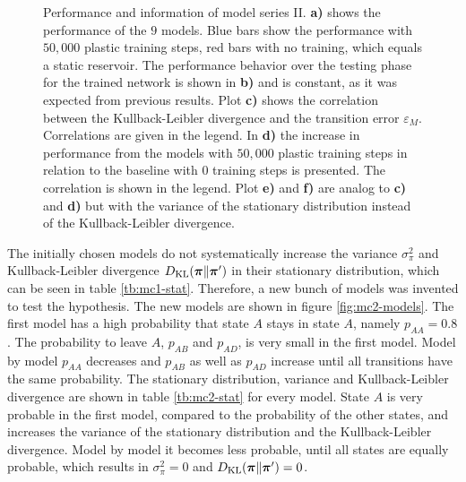 \begin{figure}[p]
    \caption[Performance and information of model series II]{Performance and information of model series II. \textbf{a)} shows the performance of the $9$ models. Blue bars show the performance with $50,000$ plastic training steps, red bars with no training, which equals a static reservoir. The performance behavior over the testing phase for the trained network is shown in \textbf{b)} and is constant, as it was expected from previous results. Plot \textbf{c)} shows the correlation between the Kullback-Leibler divergence and the transition error $\varepsilon_M$. Correlations are given in the legend. In \textbf{d)} the increase in performance from the models with $50,000$ plastic training steps in relation to the baseline with $0$ training steps is presented. The correlation is shown in the legend. Plot \textbf{e)} and \textbf{f)} are analog to \textbf{c)} and \textbf{d)} but with the variance of the stationary distribution instead of the Kullback-Leibler divergence.}
    \label{fig:mc2-performance}
\end{figure}

The initially chosen models do not systematically increase the variance $\sigma^2_\pi$ and Kullback-Leibler divergence $D_{\text{KL}}(\bm\pi\|\bm\pi')$ in their stationary distribution, which can be seen in table \ref{tb:mc1-stat}. Therefore, a new bunch of models was invented to test the hypothesis. The new models are shown in figure \ref{fig:mc2-models}. The first model has a high probability that state $A$ stays in state $A$, namely $p_{AA} = 0.8$. The probability to leave $A$, $p_{AB}$ and $p_{AD}$, is very small in the first model. Model by model $p_{AA}$ decreases and $p_{AB}$ as well as $p_{AD}$ increase until all transitions have the same probability. The stationary distribution, variance and Kullback-Leibler divergence are shown in table \ref{tb:mc2-stat} for every model. State $A$ is very probable in the first model, compared to the probability of the other states, and increases the variance of the stationary distribution and the Kullback-Leibler divergence. Model by model it becomes less probable, until all states are equally probable, which results in $\sigma^2_\pi = 0$ and $D_{\text{KL}}(\bm\pi\|\bm\pi') = 0$.


